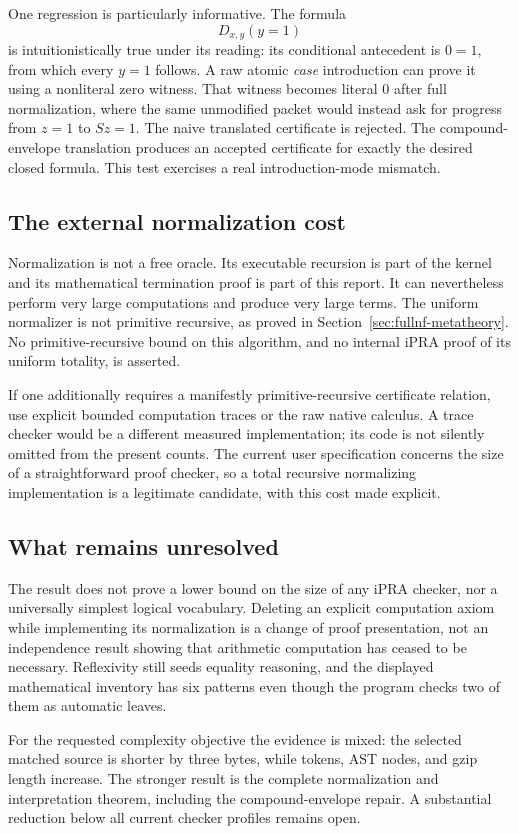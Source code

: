 One regression is particularly informative. The formula
\[
 D_{x,y}(y=1)
\]
is intuitionistically true under its reading: its conditional
antecedent is $0=1$, from which every $y=1$ follows.
A raw atomic \emph{case} introduction can prove it using a
nonliteral zero witness. That witness becomes literal $0$
after full normalization, where the same unmodified packet
would instead ask for progress from $z=1$ to $Sz=1$.
The naive translated certificate is rejected.
The compound-envelope translation produces an accepted
certificate for exactly the desired closed formula.
This test exercises a real introduction-mode mismatch.

\subsection{The external normalization cost}

Normalization is not a free oracle. Its executable recursion
is part of the kernel and its mathematical termination proof
is part of this report. It can nevertheless perform very
large computations and produce very large terms. The uniform
normalizer is not primitive recursive, as proved in
Section~\ref{sec:fullnf-metatheory}. No primitive-recursive bound
on this algorithm, and no internal iPRA proof of its uniform
totality, is asserted.

If one additionally requires a manifestly primitive-recursive
certificate relation, use explicit bounded computation traces
or the raw native calculus. A trace checker would be a different
measured implementation; its code is not silently omitted from
the present counts. The current user specification concerns
the size of a straightforward proof checker, so a total recursive
normalizing implementation is a legitimate candidate, with
this cost made explicit.

\subsection{What remains unresolved}

The result does not prove a lower bound on the size of any
iPRA checker, nor a universally simplest logical vocabulary.
Deleting an explicit computation axiom while implementing its
normalization is a change of proof presentation, not an
independence result showing that arithmetic computation has
ceased to be necessary. Reflexivity still seeds equality
reasoning, and the displayed mathematical inventory has six
patterns even though the program checks two of them as
automatic leaves.

For the requested complexity objective the evidence is mixed:
the selected matched source is shorter by three bytes, while
tokens, AST nodes, and gzip length increase. The stronger
result is the complete normalization and interpretation theorem,
including the compound-envelope repair. A substantial reduction
below all current checker profiles remains open.
